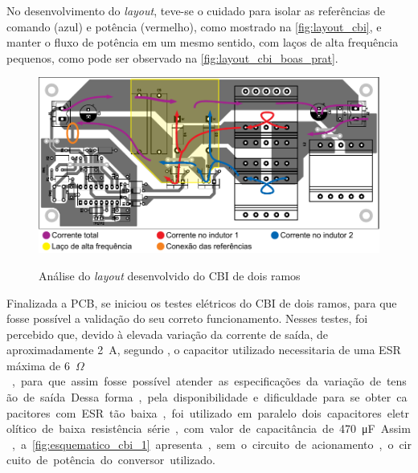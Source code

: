     No desenvolvimento do \textit{layout}, teve-se o cuidado para isolar as referências de comando (azul) e potência (vermelho), como mostrado na \autoref{fig:layout_cbi}, e manter o fluxo de potência em um mesmo sentido, com laços de alta frequência pequenos, como pode ser observado na \autoref{fig:layout_cbi_boas_prat}.
    
    \begin{figure}[H]
    	\centering
    	\caption{Análise do \textit{layout} desenvolvido do CBI de dois ramos}
    	\includegraphics[scale=1]{pdf/layout/layout_CBI3.pdf}
        \label{fig:layout_cbi_boas_prat}
    \end{figure}
    
    Finalizada a PCB, se iniciou os testes elétricos do CBI de dois ramos, para que fosse possível a validação do seu correto funcionamento. Nesses testes, foi percebido que, devido à elevada variação da corrente de saída, de aproximadamente \qty{2}{\ampere}, segundo , o capacitor utilizado necessitaria de uma ESR máxima de \qty{6}{\milli$\Omega$}, para que assim fosse possível atender as especificações da variação de tensão de saída. Dessa forma, pela disponibilidade e dificuldade para se obter capacitores com ESR tão baixa, foi utilizado em paralelo dois capacitores eletrolítico de baixa resistência série, com valor de capacitância de \qty{470}{\micro\farad}. Assim, a \autoref{fig:esquematico_cbi_1} apresenta, sem o circuito de acionamento, o circuito de potência do conversor utilizado. 
    
